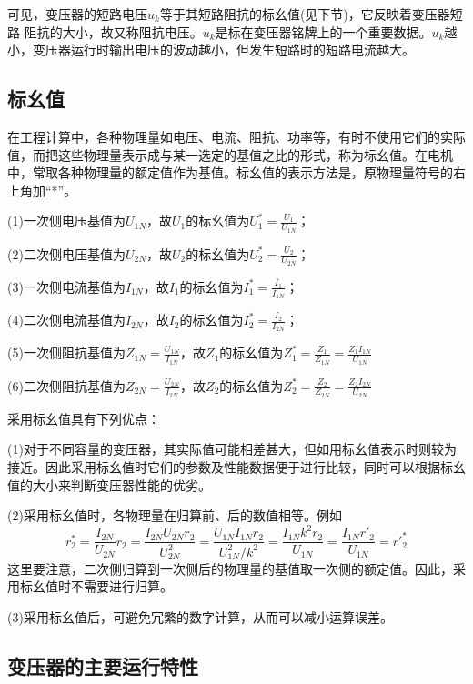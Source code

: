 \documentclass{book}
\begin{document}
可见，变压器的短路电压${{u}_{k}}$等于其短路阻抗的标幺值(见下节)，它反映着变压器短路 阻抗的大小，故又称阻抗电压。${{u}_{k}}$是标在变压器铭牌上的一个重要数据。${{u}_{k}}$越小，变压器运行时输出电压的波动越小，但发生短路时的短路电流越大。

\subsection{标幺值}
在工程计算中，各种物理量如电压、电流、阻抗、功率等，有时不使用它们的实际值，而把这些物理量表示成与某一选定的基值之比的形式，称为标幺值。在电机中，常取各种物理量的额定值作为基值。标幺值的表示方法是，原物理量符号的右上角加“*”。

(1)一次侧电压基值为${{U}_{1N}}$，故${{U}_{1}}$的标幺值为$U_{1}^{*}=\frac{{{U}_{1}}}{{{U}_{1N}}}$；

(2)二次侧电压基值为${{U}_{2N}}$，故${{U}_{2}}$的标幺值为$U_{2}^{*}=\frac{{{U}_{2}}}{{{U}_{2N}}}$；

(3)一次侧电流基值为${{I}_{1N}}$，故${{I}_{1}}$的标幺值为$I_{1}^{*}=\frac{{{I}_{1}}}{{{I}_{1N}}}$；

(4)二次侧电流基值为${{I}_{2N}}$，故${{I}_{2}}$的标幺值为$I_{2}^{*}=\frac{{{I}_{2}}}{{{I}_{2N}}}$；

(5)一次侧阻抗基值为${{Z}_{1N}}=\frac{{{U}_{1N}}}{{{I}_{1N}}}$，故${{Z}_{1}}$的标幺值为$Z_{1}^{*}=\frac{{{Z}_{1}}}{{{Z}_{1N}}}=\frac{{{Z}_{1}}{{I}_{1N}}}{{{U}_{1N}}}$

(6)二次侧阻抗基值为${{Z}_{2N}}=\frac{{{U}_{2N}}}{{{I}_{2N}}}$，故${{Z}_{2}}$的标幺值为$Z_{2}^{*}=\frac{{{Z}_{2}}}{{{Z}_{2N}}}=\frac{{{Z}_{2}}{{I}_{2N}}}{{{U}_{2N}}}$

采用标幺值具有下列优点： 

(1)对于不同容量的变压器，其实际值可能相差甚大，但如用标幺值表示时则较为接近。因此采用标幺值时它们的参数及性能数据便于进行比较，同时可以根据标幺值的大小来判断变压器性能的优劣。

(2)采用标幺值时，各物理量在归算前、后的数值相等。例如
$$r_{2}^{*}=\frac{{{I}_{2N}}}{{{U}_{2N}}}{{r}_{2}}=\frac{{{I}_{2N}}{{U}_{2N}}{{r}_{2}}}{U_{2N}^{2}}=\frac{{{U}_{1N}}{{I}_{1N}}{{r}_{2}}}{U_{1N}^{2}/{{k}^{2}}}=\frac{{{I}_{1N}}{{k}^{2}}{{r}_{2}}}{U_{1N}^{{}}}=\frac{{{I}_{1N}}{{{{r}'}}_{2}}}{U_{1N}^{{}}}={r}\prime_{2}^{*}$$
这里要注意，二次侧归算到一次侧后的物理量的基值取一次侧的额定值。因此，采用标幺值时不需要进行归算。

(3)采用标幺值后，可避免冗繁的数字计算，从而可以减小运算误差。

\subsection{变压器的主要运行特性}
\end{document}
